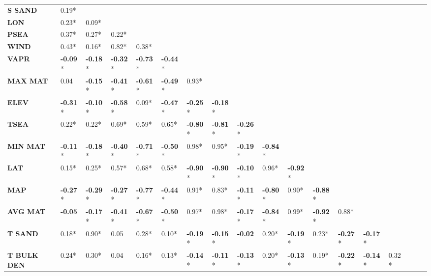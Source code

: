 \documentclass[AutoFakeBold]{LZUThesis-PgD&PhD}
\begin{document}
\begin{landscape}
\begin{table}[H]
\begin{tabular}{p{1.6cm}p{0.68cm}p{0.68cm}p{0.68cm}p{0.68cm}p{0.68cm}p{0.68cm}p{0.68cm}p{0.68cm}p{0.68cm}p{0.68cm}p{0.68cm}p{0.68cm}p{0.68cm}p{0.68cm}p{0.68cm}p{0.68cm}p{0.68cm}}
				\textbf{S SAND} & 0.19* &  &  &  &  &  &  &  &  &  &  &  &  &  &  &  &  \\
				\textbf{LON} & 0.23* & 0.09* &  &  &  &  &  &  &  &  &  &  &  &  &  &  &  \\
				\textbf{PSEA} & 0.37* & 0.27* & 0.22* &  &  &  &  &  &  &  &  &  &  &  &  &  &  \\
				\textbf{WIND} & 0.43* & 0.16* & 0.82* & 0.38* &  &  &  &  &  &  &  &  &  &  &  &  &  \\
				\textbf{VAPR} & \textbf{-0.09}* & \textbf{-0.18}* & \textbf{-0.32}* & \textbf{-0.73}* & \textbf{-0.44}* &  &  &  &  &  &  &  &  &  &  &  &  \\
				\textbf{MAX MAT} & 0.04 & \textbf{-0.15}* & \textbf{-0.41}* & \textbf{-0.61}* & \textbf{-0.49}* & 0.93* &  &  &  &  &  &  &  &  &  &  &  \\
				\textbf{ELEV} & \textbf{-0.31}* & \textbf{-0.10}* & \textbf{-0.58}* & 0.09* & \textbf{-0.47}* & \textbf{-0.25}* & \textbf{-0.18}* &  &  &  &  &  &  &  &  &  &  \\
				\textbf{TSEA} & 0.22* & 0.22* & 0.69* & 0.59* & 0.65* & \textbf{-0.80}* & \textbf{-0.81}* & \textbf{-0.26}* &  &  &  &  &  &  &  &  &  \\
				\textbf{MIN MAT} & \textbf{-0.11}* & \textbf{-0.18}* & \textbf{-0.40}* & \textbf{-0.71}* & \textbf{-0.50}* & 0.98* & 0.95* & \textbf{-0.19}* & \textbf{-0.84}* &  &  &  &  &  &  &  &  \\
				\textbf{LAT} & 0.15* & 0.25* & 0.57* & 0.68* & 0.58* & \textbf{-0.90}* & \textbf{-0.90}* & \textbf{-0.10}* & 0.96* & \textbf{-0.92}* &  &  &  &  &  &  &  \\
				\textbf{MAP} & \textbf{-0.27}* & \textbf{-0.29}* & \textbf{-0.27}* & \textbf{-0.77}* & \textbf{-0.44}* & 0.91* & 0.83* & \textbf{-0.11}* & \textbf{-0.80}* & 0.90* & \textbf{-0.88}* &  &  &  &  &  &  \\
				\textbf{AVG MAT} & \textbf{-0.05} & \textbf{-0.17}* & \textbf{-0.41}* & \textbf{-0.67}* & \textbf{-0.50}* & 0.97* & 0.98* & \textbf{-0.17}* & \textbf{-0.84}* & 0.99* & \textbf{-0.92}* & 0.88* &  &  &  &  &  \\
				\textbf{T SAND} & 0.18* & 0.90* & 0.05 & 0.28* & 0.10* & \textbf{-0.19}* & \textbf{-0.15}* & \textbf{-0.02} & 0.20* & \textbf{-0.19}* & 0.23* & \textbf{-0.27}* & \textbf{-0.17}* &  &  &  &  \\
				\textbf{T BULK DEN} & 0.24* & 0.30* & 0.04 & 0.16* & 0.13* & \textbf{-0.14}* & \textbf{-0.11}* & \textbf{-0.13}* & 0.20* & \textbf{-0.13}* & 0.19* & \textbf{-0.22}* & \textbf{-0.14}* & 0.32* &  &  &  \\

\end{tabular}
\end{table}
\end{landscape}
\end{document}
